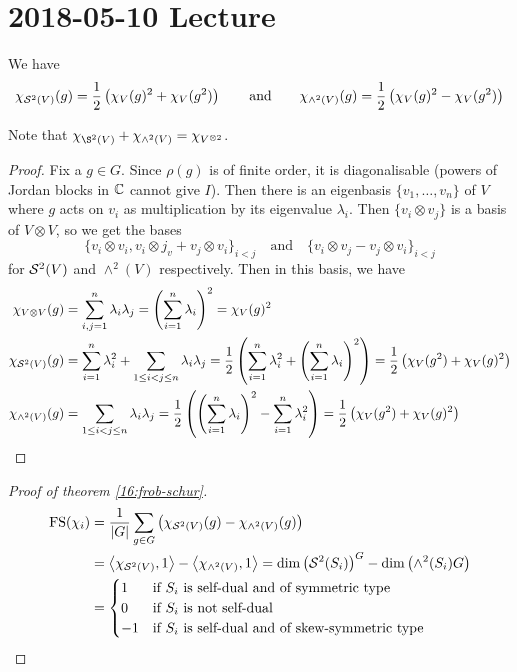 \section{2018-05-10 Lecture}

\begin{lem}
  We have
  \[\chi_{\mathcal{S}^2(V)}(g) = \frac 12 \left( \chi_V(g)^2+\chi_V(g^2) \right) \qquad\text{and}\qquad \chi_{\wedge^2(V)}(g) = \frac 12 \left( \chi_V(g)^2-\chi_V(g^2) \right)\]
\end{lem}

\begin{rmk}
  Note that $\chi_{\S^2(V)} + \chi_{\wedge^2(V)} = \chi_{V^{\otimes 2}}$.
\end{rmk}

\begin{proof}
  Fix a $g \in G$.
  Since $\rho(g)$ is of finite order, it is diagonalisable (powers of Jordan blocks in $\mathbb{C}$ cannot give $I$).
  Then there is an eigenbasis $\{v_1,\ldots,v_n\}$ of $V$ where $g$ acts on $v_i$ as multiplication by its eigenvalue $\lambda_i$.
  Then $\{v_i \otimes v_j\}$ is a basis of $V \otimes V$, so we get the bases
  \[ \{ v_i \otimes v_i, v_i \otimes j_v + v_j \otimes v_i \}_{i<j} \quad\text{and}\quad \{v_i \otimes v_j - v_j \otimes v_i \}_{i<j} \]
  for $\mathcal{S}^2(V)$ and $\wedge^2(V)$ respectively.
  Then in this basis, we have
  \begin{align*}
    \chi_{V \otimes V}(g) &= \sum_{i,j=1}^n \lambda_i\lambda_j = \left( \sum_{i=1}^n \lambda_i \right)^2 = \chi_V(g)^2 \\
    \chi_{\mathcal{S}^2(V)}(g) &= \sum_{i=1}^n \lambda_i^2 + \sum_{1 \leq i<j \leq n} \lambda_i\lambda_j = \frac 12 \left( \sum_{i=1}^n \lambda_i^2 + \left( \sum_{i=1}^n \lambda_i \right)^2 \right) = \frac 12 \left( \chi_V(g^2) + \chi_V(g)^2 \right) \\
    \chi_{\wedge^2(V)}(g) &= \sum_{1 \leq i<j \leq n} \lambda_i\lambda_j = \frac 12 \left( \left( \sum_{i=1}^n \lambda_i \right)^2 - \sum_{i=1}^n \lambda_i^2 \right) = \frac 12 \left( \chi_V(g^2) + \chi_V(g)^2 \right) \qedhere
  \end{align*}
\end{proof}

\begin{proof}[Proof of theorem \ref{16:frob-schur}]
  \begin{align*}
    \operatorname{FS}(\chi_i) &= \frac{1}{\left\lvert G \right\rvert} \sum_{g \in G} \left( \chi_{\mathcal{S}^2(V)}(g) - \chi_{\wedge^2(V)}(g) \right) \\
    &= {\left\langle \chi_{\mathcal{S}^2(V)},1 \right\rangle} - {\left\langle \chi_{\wedge^2(V)},1 \right\rangle} = \dim \left( \mathcal{S}^2(S_i) \right)^G - \dim \left( \wedge^2(S_i)G \right) \\
    &=
    \begin{cases}
      1 & \text{if $S_i$ is self-dual and of symmetric type} \\
      0 & \text{if $S_i$ is not self-dual} \\
      -1 & \text{if $S_i$ is self-dual and of skew-symmetric type}
    \end{cases}
  \end{align*}
\end{proof}

